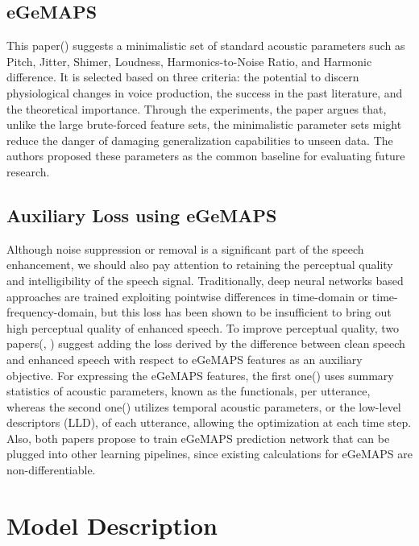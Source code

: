 \documentclass{article}
\begin{document}
\subsection{eGeMAPS}

This paper(\cite{GeMAPS}) suggests a minimalistic set of standard acoustic parameters such as Pitch, Jitter, Shimer, Loudness, Harmonics-to-Noise Ratio, and Harmonic difference. It is selected based on three criteria: the potential to discern physiological changes in voice production, the success in the past literature, and the theoretical importance. Through the experiments, the paper argues that, unlike the large brute-forced feature sets, the minimalistic parameter sets might reduce the danger of damaging generalization capabilities to unseen data. The authors proposed these parameters as the common baseline for evaluating future research. 

\subsection{Auxiliary Loss using eGeMAPS}

Although noise suppression or removal is a significant part of the speech enhancement, we should also pay attention to retaining the perceptual quality and intelligibility of the speech signal. Traditionally, deep neural networks based approaches are trained exploiting pointwise differences in time-domain or time-frequency-domain, but this loss has been shown to be insufficient to bring out high perceptual quality of enhanced speech. To improve perceptual quality, two papers(\cite{eGeMapsLoss}, \cite{TAPloss}) suggest adding the loss derived by the difference between clean speech and enhanced speech with respect to eGeMAPS features as an auxiliary objective. For expressing the eGeMAPS features, the first one(\cite{eGeMapsLoss}) uses summary statistics of acoustic parameters, known as the functionals, per utterance, whereas the second one(\cite{TAPloss}) utilizes temporal acoustic parameters, or the low-level descriptors (LLD), of each utterance, allowing the optimization at each time step. Also, both papers propose to train eGeMAPS prediction network that can be plugged into other learning pipelines, since existing calculations for eGeMAPS are non-differentiable.

\section{Model Description}
\end{document}

